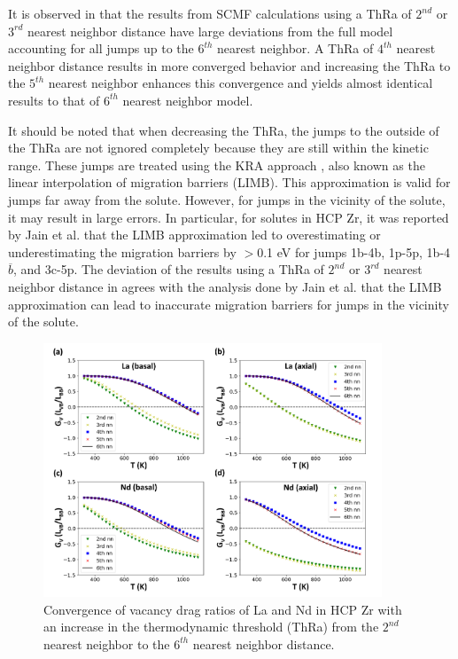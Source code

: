 \documentclass[preprint,12pt]{elsarticle}
\providecommand{\DIFaddbeginFL}{} %
\providecommand{\DIFaddendFL}{} %
\providecommand{\DIFdelbeginFL}{} %
\providecommand{\DIFdelendFL}{} %
\newcommand{\DIFscaledelfig}{0.5}
\newlength{\DIFdelgraphicswidth} %
\newlength{\DIFdelgraphicsheight} %
\newcommand{\DIFaddincludegraphics}[2][]{{\color{blue}\fbox{\DIFOincludegraphics[#1]{#2}}}} %
\newcommand{\DIFdelincludegraphics}[2][]{%
\sbox{\DIFdelgraphicsbox}{\DIFOincludegraphics[#1]{#2}}%
\settoboxwidth{\DIFdelgraphicswidth}{\DIFdelgraphicsbox} %
\settoboxtotalheight{\DIFdelgraphicsheight}{\DIFdelgraphicsbox} %
\scalebox{\DIFscaledelfig}{%
\parbox[b]{\DIFdelgraphicswidth}{\usebox{\DIFdelgraphicsbox}\\[-\baselineskip] \rule{\DIFdelgraphicswidth}{0em}}\llap{\resizebox{\DIFdelgraphicswidth}{\DIFdelgraphicsheight}{%
\setlength{\unitlength}{\DIFdelgraphicswidth}%
\begin{picture}(1,1)%
\thicklines\linethickness{2pt} %
{\color[rgb]{1,0,0}\put(0,0){\framebox(1,1){}}}%
{\color[rgb]{1,0,0}\put(0,0){\line( 1,1){1}}}%
{\color[rgb]{1,0,0}\put(0,1){\line(1,-1){1}}}%
\end{picture}%
}\hspace*{3pt}}} %
} %
\DeclareRobustCommand{\DIFaddbeginFL}{\DIFOaddbeginFL \let\includegraphics\DIFaddincludegraphics} %
\DeclareRobustCommand{\DIFaddendFL}{\DIFOaddendFL \let\includegraphics\DIFOincludegraphics} %
\DeclareRobustCommand{\DIFdelbeginFL}{\DIFOdelbeginFL \let\includegraphics\DIFdelincludegraphics} %
\DeclareRobustCommand{\DIFdelendFL}{\DIFOaddendFL \let\includegraphics\DIFOincludegraphics} %
\begin{document}
It is observed in  that the results from SCMF calculations using a ThRa of $2^{nd}$ or $3^{rd}$ nearest neighbor distance have large deviations from the full model accounting for all jumps up to the $6^{th}$ nearest neighbor. A ThRa of $4^{th}$ nearest neighbor distance results in more converged behavior and increasing the ThRa to the $5^{th}$ nearest neighbor enhances this convergence and yields almost identical results to that of $6^{th}$ nearest neighbor model.

It should be noted that when decreasing the ThRa, the jumps to the outside of the ThRa are not ignored completely because they are still within the kinetic range. These jumps are treated using the KRA approach \cite{van_der_ven_first_2005}, also known as the linear interpolation of migration barriers (LIMB). This approximation is valid for jumps far away from the solute. However, for jumps in the vicinity of the solute, it may result in large errors. In particular, for solutes in HCP Zr, it was reported by Jain et al.\cite{jain_first-principles_2019} that the LIMB approximation led to overestimating or underestimating the migration barriers by $>$0.1 eV for jumps 1b-4b, 1p-5p, 1b-4$\overline{b}$, and 3c-5p. The deviation of the results using a ThRa of $2^{nd}$ or $3^{rd}$ nearest neighbor distance in  agrees with the analysis done by Jain et al. that the LIMB approximation can lead to inaccurate migration barriers for jumps in the vicinity of the solute.

\begin{figure}[h!]
    \centering
    \DIFdelbeginFL %
\DIFdelendFL \DIFaddbeginFL \includegraphics[width=0.9\textwidth]{10_nn_convergence.jpg}
    \DIFaddendFL \caption{Convergence of vacancy drag ratios of La and Nd in HCP Zr with an increase in the thermodynamic threshold (ThRa) from the $2^{nd}$ nearest neighbor to the $6^{th}$ nearest neighbor distance.}
    \label{fig:convergence_nn}
\end{figure}
\end{document}

